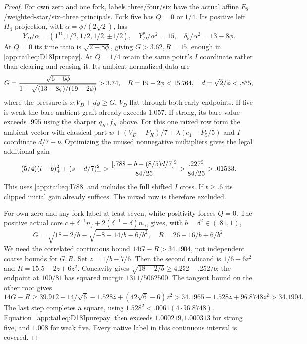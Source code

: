 \begin{proof}
For own zero and one fork, labels three/four/six have the
actual affine $E_8$/weighted-star/six--three principals.
Fork five has $Q=0$ or $1/4$. Its positive left $H_4$
projection, with $\alpha=\phi/(2\sqrt2)$, has
\[
 Y_D/\alpha=(1^{14},1/2,1/2,1/2,\pm1/2),\quad
 Y_D^2/\alpha^2=15,\quad \delta_5/\alpha^2=13-8\phi.
\]
At $Q=0$ its time ratio is $\sqrt{2+8\phi}$, giving
$G>3.62,R=15$, enough in \eqref{app:tail:eq:D18Ipurepay}.
At $Q=1/4$ retain the same point's $I$ coordinate rather
than clearing and reusing it. Its ambient normalized data are
\[
 G={\sqrt{6+6\phi}\over1+\sqrt{(13-8\phi)/(19-2\phi)}}>3.74,
 \quad R=19-2\phi<15.764,\quad d=\sqrt2/\phi<.875,
\]
where the pressure is $x.V_D+d y\ge G$, $V_D$ flat through
both early endpoints. If five is weak the bare ambient graft
already exceeds $1.057$. If strong, its bare value exceeds
$.995$ using the sharper $q_K,f_K$ above.
For this one mixed row form the ambient vector with classical
part $w+(V_D-P_K)/7+\lambda(e_1-P_5/5)$ and $I$ coordinate
$d/7+\nu$. Optimizing the unused nonnegative multipliers
gives the legal additional gain
\[
 (5/4)(t-b)_+^2+(s-d/7)_+^2
 >{[.788-b-(8/5)d/7]^2\over84/25}
 >{.227^2\over84/25}>.01533.
\]
This uses \eqref{app:tail:eq:I788} and includes the full
shifted $I$ cross. If $t\ge.6$ its clipped initial gain
already suffices. The mixed row is therefore excluded.

For own zero and any fork label at least seven, white
positivity forces $Q=0$. The positive actual core
$c+\delta^{-1}n_f+2(\delta^{-1}-\delta)n_{16}$ gives,
with $b=\delta^2\in(.81,1)$,
\[
 G=\sqrt{18-2/b}-\sqrt{-8+14/b-6/b^2},\quad
 R=26-16/b+6/b^2.
\]
We need the correlated continuous bound $14G-R>34.1904$,
not independent coarse bounds for $G,R$.
Set $z=1/b-7/6$. Then the second radicand is
$1/6-6z^2$ and $R=15.5-2z+6z^2$.
Concavity gives $\sqrt{18-2/b}\ge4.252-.252/b$;
the endpoint at $100/81$ has squared margin $1311/5062500$.
The tangent bound on the other root gives
\[
14G-R\ge39.912-14/\sqrt6-1.528z+(42\sqrt6-6)z^2
>34.1965-1.528z+96.8748z^2>34.1904.
\]
The last step completes a square, using
$1.528^2<.0061(4\cdot96.8748)$.
Equation~\eqref{app:tail:eq:D18Ipurepay} then exceeds
$1.000219,1.000313$ for strong five, and $1.008$ for weak
five. Every native label in this continuous interval is covered.


\end{proof}
